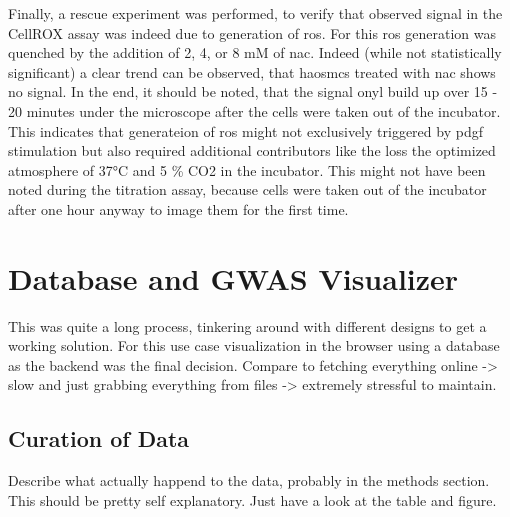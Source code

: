     Finally, a rescue experiment was performed, to verify that observed signal in the CellROX assay was indeed due to generation of \ac{ros}. For this \ac{ros} generation was quenched by the addition of 2, 4, or 8 mM of \ac{nac}. Indeed (while not statistically significant) a clear trend can be observed, that \acp{haosmc} treated with \ac{nac} shows no signal.
    In the end, it should be noted, that the signal onyl build up over 15 - 20 minutes under the microscope after the cells were taken out of the incubator. This indicates that generateion of \ac{ros} might not exclusively triggered by \ac{pdgf} stimulation but also required additional contributors like the loss the optimized atmosphere of 37°C and 5 \% CO2 in the incubator. This might not have been noted during the titration assay, because cells were taken out of the incubator after one hour anyway to image them for the first time.

\section{Database and GWAS Visualizer}
This was quite a long process, tinkering around with different designs to get a working solution. For this use case visualization in the browser using a database as the backend was the final decision. Compare to fetching everything online -> slow and just grabbing everything from files -> extremely stressful to maintain.

    \subsection{Curation of Data}
    Describe what actually happend to the data, probably in the methods section.
    This should be pretty self explanatory. Just have a look at the table and figure.

